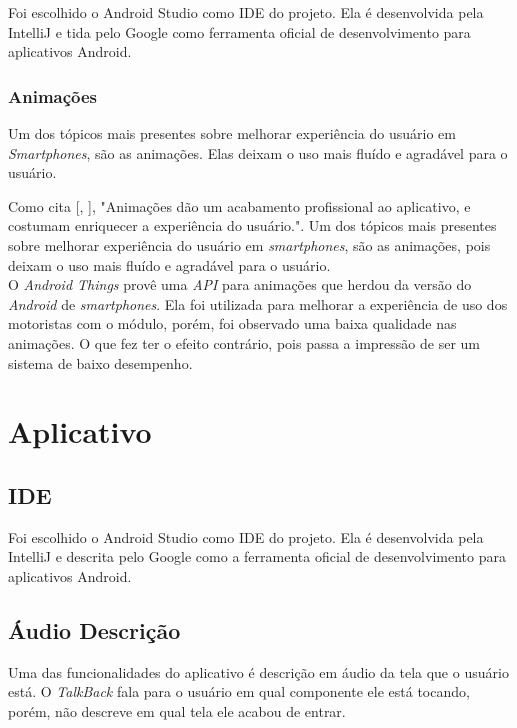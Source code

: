 \documentclass[
	12pt,				%
	oneside,			%
	a4paper,			%
	brazil				%
]{abntex2}
\newcommand{\citecustom}[1]{[\citeauthoronline{#1}, \citeyear{#1}]}
\begin{document}
Foi escolhido o Android Studio como IDE do projeto. Ela é desenvolvida pela IntelliJ e tida pelo Google como ferramenta oficial de desenvolvimento para aplicativos Android.

\subsubsection{Animações}

Um dos tópicos mais presentes sobre melhorar experiência do usuário em \textit{Smartphones}, são as animações. Elas deixam o uso mais fluído e agradável para o usuário. 

Como cita \citecustom{Lecheta2015}, "Animações dão um acabamento profissional ao aplicativo, e costumam enriquecer a experiência do usuário.". Um dos tópicos mais presentes sobre melhorar experiência do usuário em \textit{smartphones}, são as animações, pois deixam o uso mais fluído e agradável para o usuário. \\

O \textit{Android Things} provê uma \textit{API} para animações que herdou da versão do \textit{Android} de \textit{smartphones}. Ela foi utilizada para melhorar a experiência de uso dos motoristas com o módulo, porém, foi observado uma baixa qualidade nas animações. O que fez ter o efeito contrário, pois passa a impressão de ser um sistema de baixo desempenho.\\

\newpage

\section{Aplicativo}

\subsection{IDE}

Foi escolhido o Android Studio como IDE do projeto. Ela é desenvolvida pela IntelliJ e descrita pelo Google como a ferramenta oficial de desenvolvimento para aplicativos Android.

\subsection{Áudio Descrição}

Uma das funcionalidades do aplicativo é descrição em áudio da tela que o usuário está. O \textit{TalkBack} fala para o usuário em qual componente ele está tocando, porém, não descreve em qual tela ele acabou de entrar. 
\end{document}
